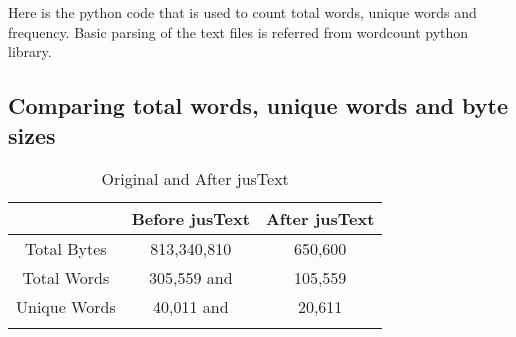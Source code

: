 

Here is the python code that is used to count total words, unique words and frequency. Basic parsing of the text files
is referred from wordcount python library\cite{Wordcount}.


\newpage 
\subsection{Comparing total words, unique words and byte sizes}


\begin{table}
\caption{Original and After jusText}
\begin{center}
  \begin{tabular}{ c | c | c }
    \hline
     & Before jusText & After jusText \\ \hline
Total Bytes & 813,340,810   &  650,600  \\ \hline
Total Words & 305,559 and & 105,559 \\ \hline
Unique Words & 40,011 and & 20,611 \\ 
\label{table:comparision}
 \end{tabular}
 \end{center}

\end{table}

